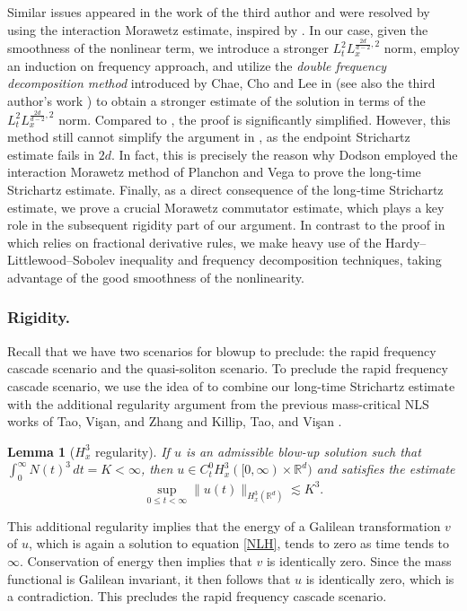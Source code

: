 \documentclass[reqno,11pt]{amsart}
\theoremstyle{plain}
\newtheorem{lemma}[theorem]{Lemma}
\theoremstyle{definition}
\numberwithin{equation}{section}
\numberwithin{theorem}{section}
\def\leq{\leqslant}
\begin{document}
 Similar issues appeared in the work of the third author and were resolved by using the interaction Morawetz estimate, inspired by \cite{Dodson-Duke}. In our case, given the smoothness of the nonlinear term, we introduce a stronger $ L_t^{2}L_x^{\frac{2d}{d-2},2} $ norm, employ an induction on frequency approach, and utilize the \emph{double frequency decomposition method} introduced by  Chae, Cho and  Lee in \cite{CCS} (see also the third author’s work \cite{Rosenzweig}) to obtain a stronger estimate of the solution in terms of the $L_t^{2}L_x^{\frac{2d}{d-2},2} $ norm. Compared to \cite{Rosenzweig}, the proof is significantly simplified. However, this method still cannot simplify the argument in \cite{Rosenzweig}, as the endpoint Strichartz estimate fails in $2d$. In fact, this is precisely the reason why Dodson \cite{Dodson-Duke} employed the interaction Morawetz method of Planchon and Vega \cite{Planchon} to prove the long-time Strichartz estimate. Finally, as a direct consequence of the long‑time Strichartz estimate, we prove a crucial Morawetz commutator estimate, which plays a key role in the subsequent rigidity part of our argument. In contrast to the proof in \cite{Dodson-JAMS} which relies on fractional derivative rules, we make heavy use of the Hardy–Littlewood–Sobolev inequality and frequency decomposition techniques, taking advantage of the good smoothness of the nonlinearity.

\subsubsection{Rigidity.}
Recall that we have two scenarios for blowup to preclude: the rapid frequency cascade scenario  and the quasi-soliton scenario. To preclude the rapid frequency cascade scenario, we use the idea of \cite{Dodson-JAMS} to combine our long-time Strichartz estimate with the additional regularity argument from the previous mass-critical NLS works of Tao, Vi\c{s}an, and Zhang \cite{TVZ-Duke} and Killip, Tao, and Vi\c{s}an \cite{KTV}.
\begin{lemma}[$H_x^3$ regularity]
    If $u$ is an admissible blow-up solution such that $\int_0^\infty N(t)^3 \, dt = K < \infty$, then $u \in C_t^0 H_x^3([0, \infty) \times \mathbb{R}^d)$ and satisfies the estimate
\[
\sup_{0 \leq t < \infty} \|u(t)\|_{H_x^3(\mathbb{R}^d)} \lesssim K^3.
\]
\end{lemma}

This additional regularity implies that the energy of a Galilean transformation $v$ of $u$, which is again a solution to equation \eqref{NLH}, tends to zero as time tends to $\infty$. Conservation of energy then implies that $v$ is identically zero. Since the mass functional is Galilean invariant, it then follows that $u$ is identically zero, which is a contradiction. This precludes the rapid frequency cascade scenario.
\end{document}
